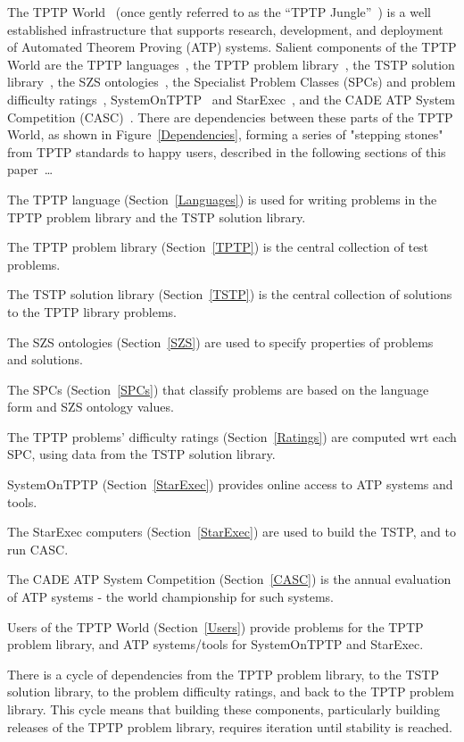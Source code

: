 \documentclass{easychair}
\newenvironment{packed_itemize}{
\vspace*{-0.2em}
\begin{itemize}
\setlength{\partopsep}{0pt}
\setlength{\itemsep}{1pt}
\setlength{\parskip}{0pt}
\setlength{\parsep}{0pt}
}{\end{itemize}}
\begin{document}
The TPTP World~\cite{Sut10,Sut17} (once gently referred to as the ``TPTP Jungle''~\cite{BU13}) is 
a well established infrastructure that supports research, development, and deployment of 
Automated Theorem Proving (ATP) systems.
Salient components of the TPTP World are
the TPTP languages~\cite{SS+06}, 
the TPTP problem library~\cite{Sut09}, 
the TSTP solution library~\cite{Sut10}, 
the SZS ontologies~\cite{Sut08-KEAPPA},
the Specialist Problem Classes (SPCs) and problem difficulty ratings~\cite{SS01},
SystemOnTPTP~\cite{Sut00-CADE-17} and StarExec~\cite{SST14},
and the CADE ATP System Competition (CASC)~\cite{Sut16}.
There are dependencies between these parts of the TPTP World, as shown in 
Figure~\ref{Dependencies}, forming a series of "stepping stones" from TPTP standards to 
happy users, described in the following sections of this paper~\ldots
\begin{packed_itemize}
\item The TPTP language (Section~\ref{Languages}) is used for writing problems in the TPTP
      problem library and the TSTP solution library.
\item The TPTP problem library (Section~\ref{TPTP}) is the central collection of test problems.
\item The TSTP solution library (Section~\ref{TSTP}) is the central collection of solutions
      to the TPTP library problems.
\item The SZS ontologies (Section~\ref{SZS}) are used to specify properties of problems
      and solutions.
\item The SPCs (Section~\ref{SPCs}) that classify problems are based on the language form 
      and SZS ontology values.
\item The TPTP problems' difficulty ratings (Section~\ref{Ratings}) are computed wrt each
      SPC, using data from the TSTP solution library.
\item SystemOnTPTP (Section~\ref{StarExec}) provides online access to ATP systems and tools.
\item The StarExec computers (Section~\ref{StarExec}) are used to build the TSTP, and to run
      CASC.
\item The CADE ATP System Competition (Section~\ref{CASC}) is the annual evaluation of 
      ATP systems - the world championship for such systems.
\item Users of the TPTP World (Section~\ref{Users}) provide problems for the TPTP problem
      library, and ATP systems/tools for SystemOnTPTP and StarExec.
\end{packed_itemize}
There is a cycle of dependencies from the TPTP problem library, to the TSTP solution 
library, to the problem difficulty ratings, and back to the TPTP problem library.
This cycle means that building these components, particularly building releases of the TPTP 
problem library, requires iteration until stability is reached.
\end{document}

